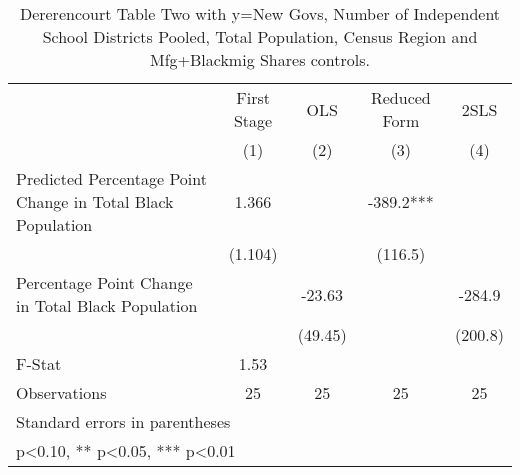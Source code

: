 \begin{table}[htbp]\centering
\def\sym#1{\ifmmode^{#1}\else\(^{#1}\)\fi}
\caption{Dererencourt Table Two with y=New Govs, Number of Independent School Districts  Pooled, Total Population, Census Region and Mfg+Blackmig Shares controls.}
\begin{tabular}{l*{4}{c}}
\toprule
                    & First Stage   &         OLS   &Reduced Form   &        2SLS   \\
                    &\multicolumn{1}{c}{(1)}   &\multicolumn{1}{c}{(2)}   &\multicolumn{1}{c}{(3)}   &\multicolumn{1}{c}{(4)}   \\
\midrule
Predicted Percentage Point Change in Total Black Population&       1.366   &               &      -389.2***&               \\
                    &     (1.104)   &               &     (116.5)   &               \\
\addlinespace
Percentage Point Change in Total Black Population&               &      -23.63   &               &      -284.9   \\
                    &               &     (49.45)   &               &     (200.8)   \\
\midrule
F-Stat              &        1.53   &               &               &               \\
Observations        &          25   &          25   &          25   &          25   \\
\bottomrule
\multicolumn{5}{l}{\footnotesize Standard errors in parentheses}\\
\multicolumn{5}{l}{\footnotesize * p<0.10, ** p<0.05, *** p<0.01}\\
\end{tabular}
\end{table}
